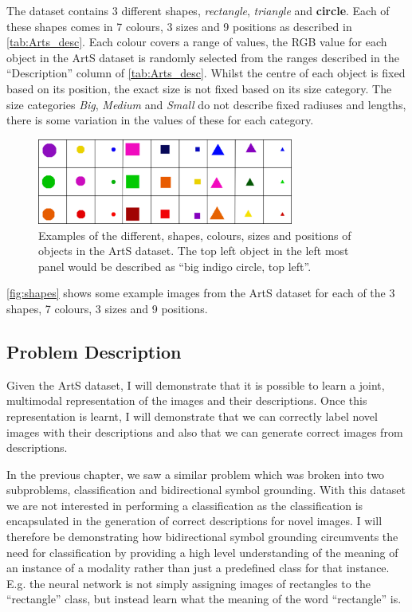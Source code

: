 The dataset contains 3 different shapes, \textit{rectangle}, \textit{triangle} and \textbf{circle}. Each of these shapes comes in 7 colours, 3 sizes and 9 positions as described in \autoref{tab:Arts_desc}. Each colour covers a range of values, the RGB value for each object in the ArtS dataset is randomly selected from the ranges described in the ``Description'' column of \autoref{tab:Arts_desc}. Whilst the centre of each object is fixed based on its position, the exact size is not fixed based on its size category. The size categories \textit{Big}, \textit{Medium} and \textit{Small} do not describe fixed radiuses and lengths, there is some variation in the values of these for each category.


\begin{figure}
\centering
\includegraphics[width=0.75\textwidth]{Figs/shapes/shapes.png}
\caption{Examples of the different, shapes, colours, sizes and positions of objects in the ArtS dataset. The top left object in the left most panel would be described as ``big indigo circle, top left''.}
\label{fig:shapes}
\end{figure}

\autoref{fig:shapes} shows some example images from the ArtS dataset for each of the 3 shapes, 7 colours, 3 sizes and 9 positions.

\subsection{Problem Description}
Given the ArtS dataset, I will demonstrate that it is possible to learn a joint, multimodal representation of the images and their descriptions. Once this representation is learnt, I will demonstrate that we can correctly label novel images with their descriptions and also that we can generate correct images from descriptions.

In the previous chapter, we saw a similar problem which was broken into two subproblems, classification and bidirectional symbol grounding. With this dataset we are not interested in performing a classification as the classification is encapsulated in the generation of correct descriptions for novel images. I will therefore be demonstrating how bidirectional symbol grounding circumvents the need for classification by providing a high level understanding of the meaning of an instance of a modality rather than just a predefined class for that instance. E.g. the neural network is not simply assigning images of rectangles to the ``rectangle'' class, but instead learn what the meaning of the word ``rectangle'' is. 

